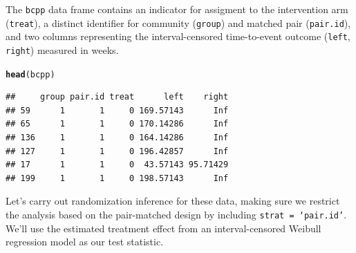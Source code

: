 \documentclass[12pt]{article}\usepackage[]{graphicx}\usepackage[]{color}
\makeatletter
\newcommand{\hlstd}[1]{\textcolor[rgb]{0.345,0.345,0.345}{#1}}%
\newcommand{\hlkwd}[1]{\textcolor[rgb]{0.737,0.353,0.396}{\textbf{#1}}}%
\newenvironment{kframe}{%
 \def\at@end@of@kframe{}%
 \ifinner\ifhmode%
  \def\at@end@of@kframe{\end{minipage}}%
  \begin{minipage}{\columnwidth}%
 \fi\fi%
 \def\FrameCommand##1{\hskip\@totalleftmargin \hskip-\fboxsep
 \colorbox{shadecolor}{##1}\hskip-\fboxsep
     \hskip-\linewidth \hskip-\@totalleftmargin \hskip\columnwidth}%
 \MakeFramed {\advance\hsize-\width
   \@totalleftmargin\z@ \linewidth\hsize
   \@setminipage}}%
 {\par\unskip\endMakeFramed%
 \at@end@of@kframe}
\newenvironment{knitrout}{}{} %
\makeatother
\begin{document}
The \texttt{bcpp} data frame contains an indicator for assigment to the intervention arm (\texttt{treat}), a distinct identifier for community (\texttt{group}) and matched pair (\texttt{pair.id}), and two columns representing the interval-censored time-to-event outcome (\texttt{left}, \texttt{right}) measured in weeks.
\begin{knitrout}
\color{fgcolor}\begin{kframe}
\begin{alltt}
\hlkwd{head}\hlstd{(bcpp)}
\end{alltt}
\begin{verbatim}
##     group pair.id treat      left    right
## 59      1       1     0 169.57143      Inf
## 65      1       1     0 170.14286      Inf
## 136     1       1     0 164.14286      Inf
## 127     1       1     0 196.42857      Inf
## 17      1       1     0  43.57143 95.71429
## 199     1       1     0 198.57143      Inf
\end{verbatim}
\end{kframe}
\end{knitrout}
Let's carry out randomization inference for these data, making sure we restrict the analysis based on the pair-matched design by including \texttt{strat = `pair.id'}. We'll use the estimated treatment effect from an interval-censored Weibull regression model as our test statistic.
\end{document}
